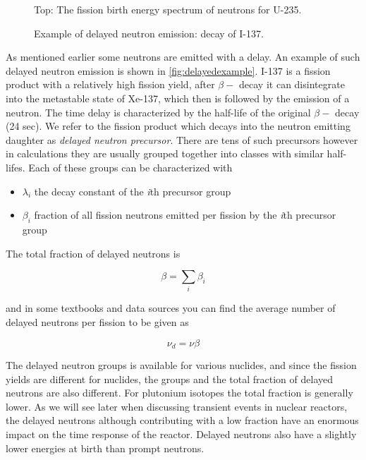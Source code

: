 \begin{figure}[ht!]
\protect {}\protect
\caption{\label{fig:watt} \footnotesize{Top: The fission birth energy spectrum of neutrons for U-235.}}
\end{figure}

\begin{figure}[ht!]
\protect {}\protect
\caption{\label{fig:delayedexample} \footnotesize{Example of delayed neutron emission: decay of I-137.}}
\end{figure}

As mentioned earlier some neutrons are emitted with a delay. An example of such delayed neutron emission is shown in \autoref{fig:delayedexample}. I-137 is a fission product with a relatively high fission yield, after $\beta -$ decay it can disintegrate into the metastable state of Xe-137, which then is followed by the emission of a neutron. The time delay is characterized by the half-life of the original $\beta -$ decay (24 sec). We refer to the fission product which decays into the neutron emitting daughter as \textit{delayed neutron precursor}. There are tens of such precursors however in calculations they are usually grouped together into classes with similar half-lifes. Each of these groups can be characterized with

\begin{itemize}
\item $\lambda_i$ the decay constant of the \textit{i}th precursor group
\item $\beta_i$ fraction of all fission neutrons emitted per fission by the \textit{i}th precursor group
\end{itemize} 

The total fraction of delayed neutrons is

\[
\beta=\sum_i \beta_i
\]

and in some textbooks and data sources you can find the average number of delayed neutrons per fission to be given as

\[
\nu_d=\nu\beta
\]


The delayed neutron groups is available for various nuclides, and since the fission yields are different for nuclides, the groups and the total fraction of delayed neutrons are also different. For plutonium isotopes the total fraction is generally lower. As we will see later when discussing transient events in nuclear reactors, the delayed neutrons although contributing with a low fraction have an enormous impact on the time response of the reactor. Delayed neutrons also have a slightly lower energies at birth than prompt neutrons. 

